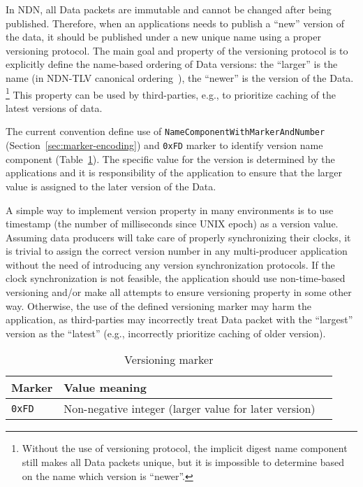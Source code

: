 In NDN, all Data packets are immutable and cannot be changed after being published.
Therefore, when an applications needs to publish a ``new'' version of the data, it should be published under a new unique name using a proper versioning protocol.
The main goal and property of the versioning protocol is to explicitly define the name-based ordering of Data versions: the ``larger'' is the name (in NDN-TLV canonical ordering~\cite{ndn-tlv}), the ``newer'' is the version of the Data.%
\footnote{Without the use of versioning protocol, the implicit digest name component still makes all Data packets unique, but it is impossible to determine based on the name which version is ``newer''.}
This property can be used by third-parties, e.g., to prioritize caching of the latest versions of data.

The current convention define use of \texttt{NameComponentWithMarkerAndNumber} (Section~\ref{sec:marker-encoding}) and \verb|0xFD| marker to identify version name component (Table~\ref{tab:versioning}).
The specific value for the version is determined by the applications and it is responsibility of the application to ensure that the larger value is assigned to the later version of the Data.

A simple way to implement version property in many environments is to use timestamp (the number of milliseconds since UNIX epoch) as a version value.
Assuming data producers will take care of properly synchronizing their clocks, it is trivial to assign the correct version number in any multi-producer application without the need of introducing any version synchronization protocols.
If the clock synchronization is not feasible, the application should use non-time-based versioning and/or make all attempts to ensure versioning property in some other way.
Otherwise, the use of the defined versioning marker may harm the application, as third-parties may incorrectly treat Data packet with the ``largest'' version as the ``latest'' (e.g., incorrectly prioritize caching of older version).


\begin{table}[h!]
  \centering
  \caption{Versioning marker}
  \label{tab:versioning}
  \begin{tabular}{|l|l|l|}
    \hline
    Marker & Value meaning \\
    \hline \hline
    \verb|0xFD| & Non-negative integer (larger value for later version) \\
    \hline
  \end{tabular}
\end{table}


